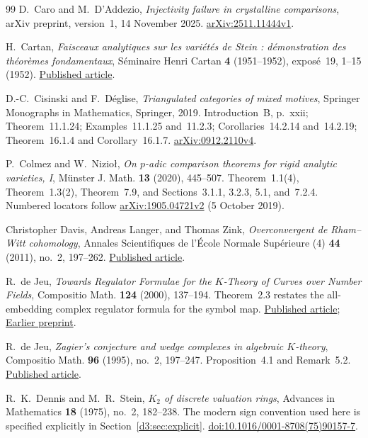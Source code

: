 \documentclass[11pt,a4paper]{amsart}
\numberwithin{equation}{section}
\theoremstyle{definition}
\theoremstyle{remark}
\begin{document}
\begin{thebibliography}{99}
D.~Caro and M.~D'Addezio,
\emph{Injectivity failure in crystalline comparisons},
arXiv preprint, version~1, 14 November 2025.
\href{https://arxiv.org/abs/2511.11444v1}{arXiv:2511.11444v1}.

H.~Cartan,
\emph{Faisceaux analytiques sur les vari\'et\'es de Stein :
d\'emonstration des th\'eor\`emes fondamentaux},
S\'eminaire Henri Cartan \textbf{4} (1951--1952),
expos\'e~19, 1--15 (1952).
\href{https://numdam.org/item/SHC_1951-1952__4__A19_0/}{Published article}.

D.-C.~Cisinski and F.~D\'eglise,
\emph{Triangulated categories of mixed motives},
Springer Monographs in Mathematics, Springer, 2019.
Introduction~B, p.~xxii; Theorem~11.1.24;
Examples~11.1.25 and~11.2.3; Corollaries~14.2.14 and~14.2.19;
Theorem~16.1.4 and Corollary~16.1.7.
\href{https://arxiv.org/abs/0912.2110v4}{arXiv:0912.2110v4}.

P.~Colmez and W.~Nizio\l, \emph{On $p$-adic comparison theorems for rigid analytic varieties, I},
M\"unster J. Math. \textbf{13} (2020), 445--507.
Theorem~1.1(4), Theorem~1.3(2), Theorem~7.9, and
Sections~3.1.1, 3.2.3, 5.1, and~7.2.4.
Numbered locators follow
\href{https://arxiv.org/abs/1905.04721v2}{arXiv:1905.04721v2}
(5 October 2019).

Christopher Davis, Andreas Langer, and Thomas Zink,
\emph{Overconvergent de Rham--Witt cohomology},
Annales Scientifiques de l'\'Ecole Normale Sup\'erieure (4)
\textbf{44} (2011), no.~2, 197--262.
\href{https://www.numdam.org/item/10.24033/asens.2143.pdf}{Published article}.

R.~de Jeu, \emph{Towards Regulator Formulae for the $K$-Theory of Curves over Number Fields}, Compositio Math. \textbf{124} (2000), 137--194. Theorem~2.3 restates the all-embedding complex regulator formula for the symbol map.
\href{https://doi.org/10.1023/A:1026440915009}{Published article};
\href{https://arxiv.org/abs/math/9811192}{Earlier preprint}.

R.~de Jeu, \emph{Zagier's conjecture and wedge complexes in algebraic $K$-theory}, Compositio Math. \textbf{96} (1995), no.~2, 197--247. Proposition~4.1 and Remark~5.2.
\href{https://www.numdam.org/article/CM_1995__96_2_197_0.pdf}{Published article}.

R.~K.~Dennis and M.~R.~Stein, \emph{$K_2$ of discrete valuation rings}, Advances in Mathematics \textbf{18} (1975), no.~2, 182--238. The modern sign convention used here is specified explicitly in Section~\ref{d3:sec:explicit}.
\href{https://doi.org/10.1016/0001-8708(75)90157-7}{doi:10.1016/0001-8708(75)90157-7}.


\end{thebibliography}
\end{document}
